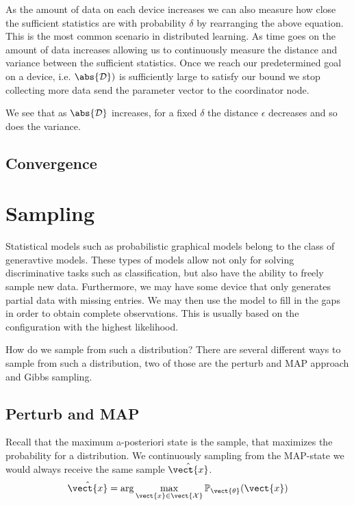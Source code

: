As the amount of data on each device increases we can also measure how close the sufficient statistics are with probability $\delta$ by rearranging the above equation. 
This is the most common scenario in distributed learning. As time goes on the amount of data increases allowing us to continuously measure the distance and variance between the sufficient statistics.
Once we reach our predetermined goal on a device, i.e. $\abs{\mathcal{D}}^^i$ is sufficiently large to satisfy our bound we stop collecting more data send the parameter vector to the coordinator node.


We see that as $\abs{\mathcal{D}}$ increases, for a fixed $\delta$ the distance $\epsilon$ decreases and so does the variance. 

\subsection{Convergence}
\section{Sampling}
Statistical models such as probabilistic graphical models belong to the class of generavtive models.
These types of models allow not only for solving discriminative tasks such as classification, but also have the ability to freely sample new data.
Furthermore, we may have some device that only generates partial data with missing entries.
We may then use the model to fill in the gaps in order to obtain complete observations.
This is usually based on the configuration with the highest likelihood.

How do we sample from such a distribution? There are several different ways to sample from such a distribution, two of those are the perturb and MAP approach and Gibbs sampling.


\subsection{Perturb and MAP}
\label{ssec:pmap}
Recall that the maximum a-posteriori state is the sample, that maximizes the probability for a distribution. 
We continuously sampling from the MAP-state we would always receive the same sample $\hat{\vect{x}}$.
\begin{equation}
    \hat{\vect{x}}  = \arg\max_{\vect{x} \in \vect{\mathcal{X}}} \mathbb{P}_{\vect{\theta}}(\vect{x})
\end{equation}

